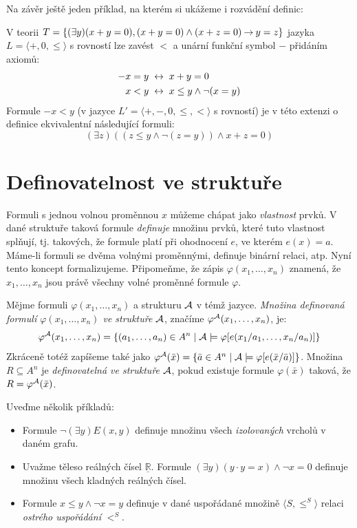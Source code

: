 Na závěr ještě jeden příklad, na kterém si ukážeme i rozvádění definic:
\begin{example}
    V teorii $T=\{(\exists y)(x+y=0),(x+y=0)\land(x+z=0)\mathbin{\rightarrow} y=z\}$ jazyka $L=\langle +,0,\leq\rangle$ s rovností lze zavést $<$ a unární funkční symbol $-$ přidáním axiomů:
    \begin{align*}
        -x=y\ &\mathbin{\leftrightarrow}\ x+y=0\\
        x<y\ &\mathbin{\leftrightarrow}\ x\leq y\land\neg(x=y)
    \end{align*}
    Formule $-x<y$ (v jazyce $L'=\langle +,-,0,\leq,<\rangle$ s rovností) je v této extenzi o definice ekvivalentní následující formuli:
    $$
    (\exists z)((z\leq y\land\neg(z=y))\land x+z=0)
    $$
\end{example}


\section{Definovatelnost ve struktuře}\label{section:definability}

Formuli s jednou volnou proměnnou $x$ můžeme chápat jako \emph{vlastnost} prvků. V dané struktuře taková formule \emph{definuje} množinu prvků, které tuto vlastnost splňují, tj. takových, že formule platí při ohodnocení $e$, ve kterém $e(x)=a$. Máme-li formuli se dvěma volnými proměnnými, definuje binární relaci, atp. Nyní tento koncept formalizujeme. Připomeňme, že zápis $\varphi(x_1,\dots,x_n)$ znamená, že $x_1,\dots,x_n$ jsou právě všechny volné proměnné formule $\varphi$.

\begin{definition}
    Mějme formuli $\varphi(x_1,\dots,x_n)$ a strukturu $\mathcal{A}$ v témž jazyce. \emph{Množina definovaná formulí $\varphi(x_1,\dots,x_n)$ ve struktuře $\mathcal{A}$}, značíme $\varphi^{\mathcal{A}}(x_1,\dots,x_n)$, je:
    $$
    \varphi^{\mathcal{A}}(x_1,\dots,x_n)=\{(a_1,\dots,a_n)\in A^n\mid\mathcal{A}\models\varphi[e(x_1/a_1,\dots,x_n/a_n)]\}
    $$
Zkráceně totéž zapíšeme také jako $\varphi^{\mathcal{A}}(\bar x)=\{\bar a\in A^n\mid\mathcal{A}\models\varphi[e(\bar x/\bar a)]\}$. Množina $R\subseteq A^n$ je \emph{definovatelná ve struktuře $\mathcal{A}$}, pokud existuje formule $\varphi(\bar x)$ taková, že $R=\varphi^{\mathcal{A}}(\bar x)$.
\end{definition}

\begin{example} Uveďme několik příkladů:
    \begin{itemize}
        \item Formule $\neg(\exists y)E(x,y)$ definuje množinu všech \emph{izolovaných} vrcholů v daném grafu.
        \item Uvažme těleso reálných čísel $\underline{\mathbb R}$. Formule $(\exists y)(y\cdot y=x)\land\neg x=0$ definuje množinu všech kladných reálných čísel.
        \item Formule $x\leq y\land \neg x=y$ definuje v dané uspořádané množině $\langle S,\leq^S\rangle$ relaci \emph{ostrého uspořádání} $<^S$. 
    \end{itemize}
\end{example}

